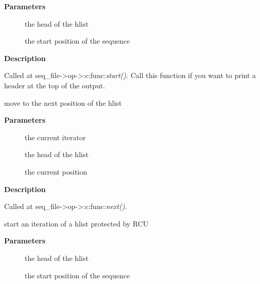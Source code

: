 \documentclass[a4paper,8pt,english]{sphinxmanual}
\begin{document}
\textbf{Parameters}
\begin{description}
\item[{}] \leavevmode
the head of the hlist

\item[{}] \leavevmode
the start position of the sequence

\end{description}

\textbf{Description}

Called at seq\_file-\textgreater{}op-\textgreater{}:c:func:\emph{start()}. Call this function if you want to
print a header at the top of the output.

\begin{fulllineitems}
\label{filesystems/index:c.seq_hlist_next}
move to the next position of the hlist

\end{fulllineitems}


\textbf{Parameters}
\begin{description}
\item[{}] \leavevmode
the current iterator

\item[{}] \leavevmode
the head of the hlist

\item[{}] \leavevmode
the current position

\end{description}

\textbf{Description}

Called at seq\_file-\textgreater{}op-\textgreater{}:c:func:\emph{next()}.

\begin{fulllineitems}
\label{filesystems/index:c.seq_hlist_start_rcu}
start an iteration of a hlist protected by RCU

\end{fulllineitems}


\textbf{Parameters}
\begin{description}
\item[{}] \leavevmode
the head of the hlist

\item[{}] \leavevmode
the start position of the sequence

\end{description}
\end{document}
